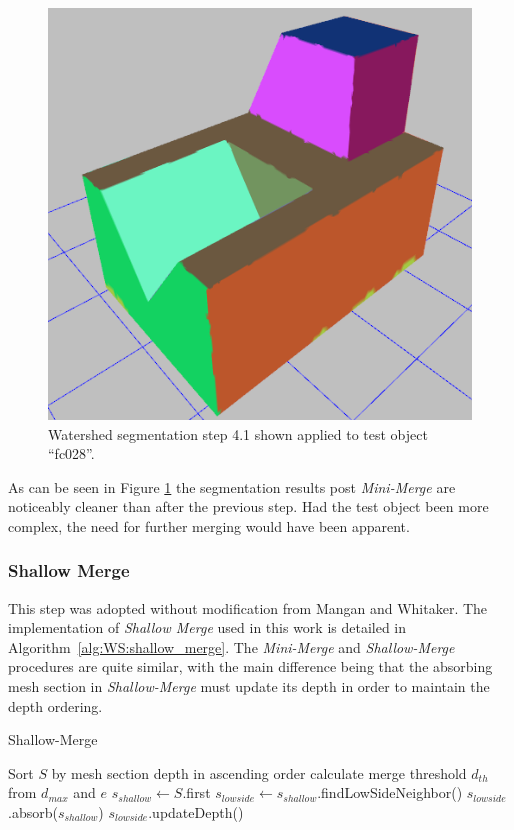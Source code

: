 \begin{figure}[htb]
	\centering
	\includegraphics[width=0.5\linewidth]{../resources/watershed/fc028_WS4.1.png}
\caption{
Watershed segmentation step 4.1 shown applied to test object ``fc028''.
}
	\label{fig:ws_4.1}
\end{figure}

As can be seen in Figure \ref{fig:ws_4.1} the segmentation results post \textit{Mini-Merge} are noticeably cleaner than after the previous step.
Had the test object been more complex, the need for further merging would have been apparent.

\subsubsection{Shallow Merge}
This step was adopted without modification from Mangan and Whitaker.
The implementation of \textit{Shallow Merge} used in this work is detailed in Algorithm~\ref{alg:WS:shallow_merge}.
The \textit{Mini-Merge} and \textit{Shallow-Merge} procedures are quite similar, with the main difference being that the absorbing mesh section in \textit{Shallow-Merge} must update its depth in order to maintain the depth ordering.

\begin{algorithm}[htb]
\caption{Shallow-Merge}\label{alg:WS:shallow_merge}
\begin{algorithmic}[1]
		\State Sort $S$ by mesh section depth in ascending order
		\State calculate merge threshold $d_{th}$ from $d_{max}$ and $e$ 
			\State $s_{shallow} \leftarrow S$.first
			\State $s_{lowside} \leftarrow s_{shallow}$.findLowSideNeighbor()
			\State $s_{lowside}$.absorb($s_{shallow}$)
			\State $s_{lowside}$.updateDepth()
		\EndWhile
	\EndFunction
\end{algorithmic}
\end{algorithm}

